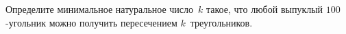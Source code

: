 \begin{problems}
\item
Определите минимальное натуральное число~$k$ такое, что любой выпуклый
$100$-угольник можно получить пересечением $k$~треугольников.


\end{problems}

